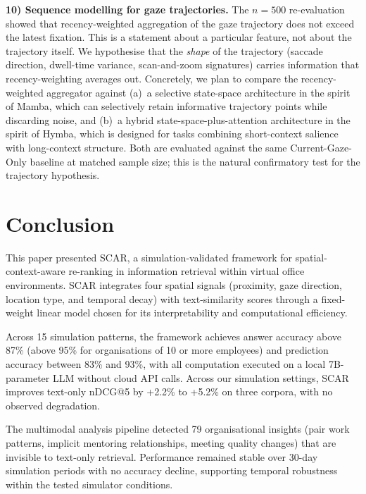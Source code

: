 \documentclass[journal]{IEEEtran}
\begin{document}
\textbf{10) Sequence modelling for gaze trajectories.}
The $n{=}500$ re-evaluation showed that recency-weighted aggregation of the
gaze trajectory does not exceed the latest fixation. This is a statement
about a particular feature, not about the trajectory itself. We hypothesise
that the \emph{shape} of the trajectory (saccade direction, dwell-time
variance, scan-and-zoom signatures) carries information that recency-weighting
averages out. Concretely, we plan to compare the recency-weighted aggregator
against (a)~a selective state-space architecture in the spirit of Mamba,
which can selectively retain informative trajectory points while discarding
noise, and (b)~a hybrid state-space-plus-attention architecture in the spirit
of Hymba, which is designed for tasks combining short-context salience with
long-context structure. Both are evaluated against the same Current-Gaze-Only
baseline at matched sample size; this is the natural confirmatory test for
the trajectory hypothesis.

\section{Conclusion}
\label{sec:conclusion}

This paper presented SCAR, a simulation-validated framework for spatial-context-aware re-ranking in information retrieval within virtual office environments.
SCAR integrates four spatial signals (proximity, gaze direction, location type, and temporal decay) with text-similarity scores through a fixed-weight linear model chosen for its interpretability and computational efficiency.

Across 15 simulation patterns, the framework achieves answer accuracy above 87\% (above 95\% for organisations of 10 or more employees) and prediction accuracy between 83\% and 93\%, with all computation executed on a local 7B-parameter LLM without cloud API calls.
Across our simulation settings, SCAR improves text-only nDCG@5 by +2.2\% to +5.2\% on three corpora, with no observed degradation.

The multimodal analysis pipeline detected 79 organisational insights (pair work patterns, implicit mentoring relationships, meeting quality changes) that are invisible to text-only retrieval.
Performance remained stable over 30-day simulation periods with no accuracy decline, supporting temporal robustness within the tested simulator conditions.
\end{document}
